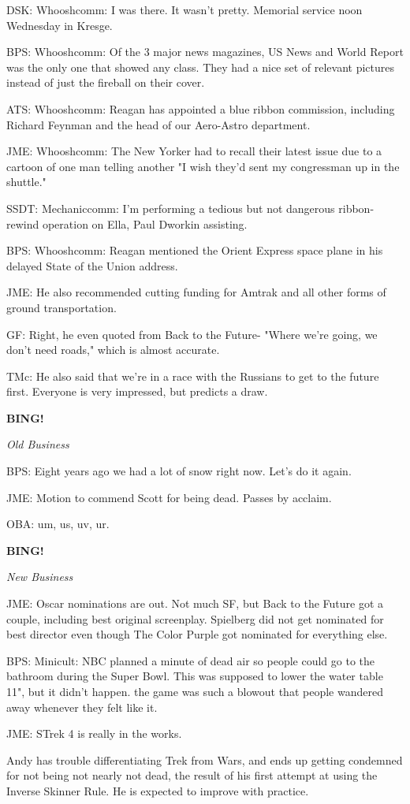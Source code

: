 \documentclass[12pt]{article}
\newcommand{\bing}{{\bf BING!} }
\newcommand{\goto}[1]{\bing \vskip 12pt \centerline{{\em{#1}}}}
\begin{document}
DSK: Whooshcomm: I was there. It wasn't pretty. Memorial service noon Wednesday in Kresge.

BPS: Whooshcomm: Of the 3 major news magazines, US News and World Report was the only one that showed any class. They had a nice set of relevant pictures instead of just the fireball on their cover.

ATS: Whooshcomm: Reagan has appointed a blue ribbon commission, including Richard Feynman and the head of our Aero-Astro department.

JME: Whooshcomm: The New Yorker had to recall their latest issue due to a cartoon of one man telling another "I wish they'd sent my congressman up in the shuttle."

SSDT: Mechaniccomm: I'm performing a tedious but not dangerous ribbon-rewind operation on Ella, Paul Dworkin assisting.

BPS: Whooshcomm: Reagan mentioned the Orient Express space plane in his delayed State of the Union address.

JME: He also recommended cutting funding for Amtrak and all other forms of ground transportation.

GF: Right, he even quoted from Back to the Future- "Where we're going, we don't need roads," which is almost accurate.

TMc: He also said that we're in a race with the Russians to get to the future first. Everyone is very impressed, but predicts a draw.

\goto{Old Business}

BPS: Eight years ago we had a lot of snow right now. Let's do it again.

JME: Motion to commend Scott for being dead. Passes by acclaim.

OBA: um, us, uv, ur.

\goto{New Business}

JME: Oscar nominations are out. Not much SF, but Back to the Future got a couple, including best original screenplay. Spielberg did not get nominated for best director even though The Color Purple got nominated for everything else.

BPS: Minicult: NBC planned a minute of dead air so people could go to the bathroom during the Super Bowl. This was supposed to lower the water table 11", but it didn't happen. the game was such a blowout that people wandered away whenever they felt like it.

JME: STrek 4 is really in the works.

Andy has trouble differentiating Trek from Wars, and ends up getting condemned for not being not nearly not dead, the result of his first attempt at using the Inverse Skinner Rule. He is expected to improve with practice.
\end{document}
